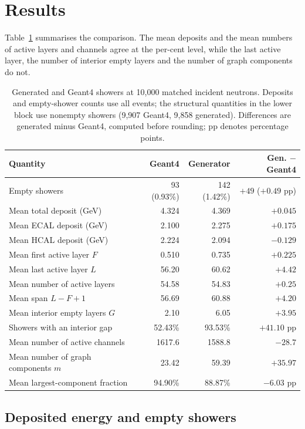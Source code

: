 \documentclass[11pt]{article}
\begin{document}
\section{Results}
\label{sec:results}

Table~\ref{tab:results} summarises the comparison. The mean deposits and the mean numbers of active layers and channels agree at the per-cent level, while the last active layer, the number of interior empty layers and the number of graph components do not.

\begin{table}[H]
\centering
\caption{Generated and Geant4 showers at 10,000 matched incident neutrons. Deposits and empty-shower counts use all events; the structural quantities in the lower block use nonempty showers (9,907 Geant4, 9,858 generated). Differences are generated minus Geant4, computed before rounding; pp denotes percentage points.}
\label{tab:results}
\small
\begin{tabular}{@{}lrrr@{}}
\toprule
Quantity & Geant4 & Generator & Gen. $-$ Geant4 \\
\midrule
Empty showers & 93 (0.93\%) & 142 (1.42\%) & $+49$ ($+0.49$ pp) \\
Mean total deposit (GeV) & 4.324 & 4.369 & $+0.045$ \\
Mean ECAL deposit (GeV) & 2.100 & 2.275 & $+0.175$ \\
Mean HCAL deposit (GeV) & 2.224 & 2.094 & $-0.129$ \\
\midrule
Mean first active layer $F$ & 0.510 & 0.735 & $+0.225$ \\
Mean last active layer $L$ & 56.20 & 60.62 & $+4.42$ \\
Mean number of active layers & 54.58 & 54.83 & $+0.25$ \\
Mean span $L-F+1$ & 56.69 & 60.88 & $+4.20$ \\
Mean interior empty layers $G$ & 2.10 & 6.05 & $+3.95$ \\
Showers with an interior gap & 52.43\% & 93.53\% & $+41.10$ pp \\
Mean number of active channels & 1617.6 & 1588.8 & $-28.7$ \\
Mean number of graph components $m$ & 23.42 & 59.39 & $+35.97$ \\
Mean largest-component fraction & 94.90\% & 88.87\% & $-6.03$ pp \\
\bottomrule
\end{tabular}
\end{table}

\subsection{Deposited energy and empty showers}
\end{document}
